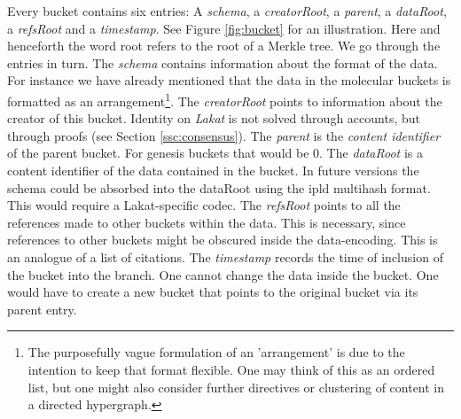 \documentclass[14pt]{article}
\begin{document}
Every bucket contains six entries: A \textit{schema}, a \textit{creatorRoot}, a \textit{parent}, a \textit{dataRoot}, a \textit{refsRoot} and a \textit{timestamp}. See Figure \ref{fig:bucket} for an illustration. Here and henceforth the word root refers to the root of a Merkle tree. We go through the entries in turn. The \textit{schema} contains information about the format of the data. For instance we have already mentioned that the data in the molecular buckets is formatted as an arrangement\footnote{The purposefully vague formulation of an 'arrangement' is due to the intention to keep that format flexible. One may think of this as an ordered list, but one might also consider further directives or clustering of content in a directed hypergraph.}. The \textit{creatorRoot} points to information about the creator of this bucket. Identity on \textit{Lakat} is not solved through accounts, but through proofs (see Section \ref{ssc:consensus}). The \textit{parent} is the \textit{content identifier} of the parent bucket. For genesis buckets that would be 0. The \textit{dataRoot} is a content identifier of the data contained in the bucket. In future versions the schema could be absorbed into the dataRoot using the ipld multihash format. This would require a Lakat-specific codec. The \textit{refsRoot} points to all the references made to other buckets within the data. This is necessary, since references to other buckets might be obscured inside the data-encoding. This is an analogue of a list of citations. The \textit{timestamp} records the time of inclusion of the bucket into the branch. One cannot change the data inside the bucket. One would have to create a new bucket that points to the original bucket via its parent entry. 
\end{document}
